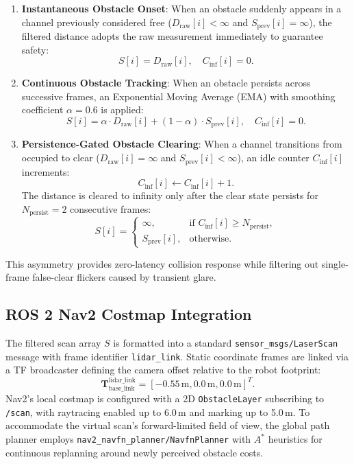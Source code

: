 \documentclass{ieeeaccess}
\begin{document}
\begin{enumerate}
  \item \textbf{Instantaneous Obstacle Onset}: When an obstacle suddenly appears in a channel previously considered free ($D_{\mathrm{raw}}[i] < \infty$ and $S_{\mathrm{prev}}[i] = \infty$), the filtered distance adopts the raw measurement immediately to guarantee safety:
  \begin{equation}
    S[i] = D_{\mathrm{raw}}[i], \quad C_{\mathrm{inf}}[i] = 0.
  \end{equation}
  \item \textbf{Continuous Obstacle Tracking}: When an obstacle persists across successive frames, an Exponential Moving Average (EMA) with smoothing coefficient $\alpha = 0.6$ is applied:
  \begin{equation}
    S[i] = \alpha \cdot D_{\mathrm{raw}}[i] + (1 - \alpha) \cdot S_{\mathrm{prev}}[i], \quad C_{\mathrm{inf}}[i] = 0.
  \end{equation}
  \item \textbf{Persistence-Gated Obstacle Clearing}: When a channel transitions from occupied to clear ($D_{\mathrm{raw}}[i] = \infty$ and $S_{\mathrm{prev}}[i] < \infty$), an idle counter $C_{\mathrm{inf}}[i]$ increments:
  \begin{equation}
    C_{\mathrm{inf}}[i] \gets C_{\mathrm{inf}}[i] + 1.
  \end{equation}
  The distance is cleared to infinity only after the clear state persists for $N_{\mathrm{persist}} = 2$ consecutive frames:
  \begin{equation}
    S[i] = \begin{cases} \infty, & \text{if } C_{\mathrm{inf}}[i] \ge N_{\mathrm{persist}}, \\ S_{\mathrm{prev}}[i], & \text{otherwise.} \end{cases}
  \end{equation}
\end{enumerate}
This asymmetry provides zero-latency collision response while filtering out single-frame false-clear flickers caused by transient glare.

\subsection{ROS 2 Nav2 Costmap Integration}
The filtered scan array $S$ is formatted into a standard \texttt{sensor\_msgs/LaserScan} message with frame identifier \texttt{lidar\_link}. Static coordinate frames are linked via a TF broadcaster defining the camera offset relative to the robot footprint:
\begin{equation}
  \mathbf{T}_{\mathrm{base\_link}}^{\mathrm{lidar\_link}} = [-0.55\,\text{m}, 0.0\,\text{m}, 0.0\,\text{m}]^T.
\end{equation}
Nav2's local costmap is configured with a 2D \texttt{ObstacleLayer} subscribing to \texttt{/scan}, with raytracing enabled up to 6.0\,m and marking up to 5.0\,m. To accommodate the virtual scan's forward-limited field of view, the global path planner employs \texttt{nav2\_navfn\_planner/NavfnPlanner} with $A^*$ heuristics for continuous replanning around newly perceived obstacle costs.
\end{document}
